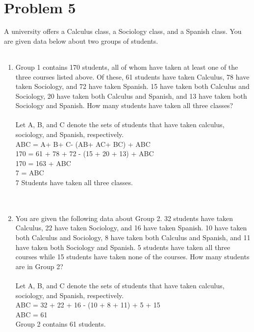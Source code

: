 \documentclass{amsart}
\theoremstyle{definition}
\theoremstyle{Exercise}
\theoremstyle{remark}
\theoremstyle{rule}
\numberwithin{equation}{section}
\begin{document}
 \newpage

\section*{Problem 5}

A university offers a Calculus class, a Sociology class, and a Spanish class. You are given data below about two groups of students.\\\\
     \begin{enumerate}[label=(\roman*)]
     \item Group 1 contains 170 students, all of whom have taken at least one of the three courses listed above. Of these, 61 students have taken Calculus, 78 have taken Sociology, and 72 have taken Spanish. 15 have taken both Calculus and Sociology, 20 have taken both Calculus and Spanish, and 13 have taken both Sociology and Spanish. How many students have taken all three classes?\\\\
Let A, B, and C denote the sets of students that have taken calculus, sociology, and Spanish, respectively.\\
\mid A\cup B\cup C \mid = \mid A\mid + \mid B\mid + \mid C\mid - (\mid A\cap B\mid + \mid A\cap C\mid + \mid B\cap C\mid) + \mid A\cap B\cap C \mid\\
170 = 61 + 78 + 72 - (15 + 20 + 13) + \mid A\cap B\cap C \mid\\
170 = 163 + \mid A\cap B\cap C \mid\\
7 = \mid A\cap B\cap C \mid\\
7 Students have taken all three classes.
\\\\\
   
\item You are given the following data about Group 2. 32 students have taken Calculus, 22 have taken Sociology, and 16 have taken Spanish. 10 have taken both Calculus and Sociology, 8 have taken both Calculus and Spanish, and 11 have taken both Sociology and Spanish. 5 students have taken all three courses while 15 students have taken none of the courses. How many students are in Group 2?\\\\
Let A, B, and C denote the sets of students that have taken calculus, sociology, and Spanish, respectively.\\
\mid A\cup B\cup C \mid = 32 + 22 + 16 - (10 + 8 + 11) + 5 + 15\\
\mid A\cup B\cup C \mid = 61\\
Group 2 contains 61 students.
\\\\\
         \end{enumerate}
 \newpage
\end{document}
